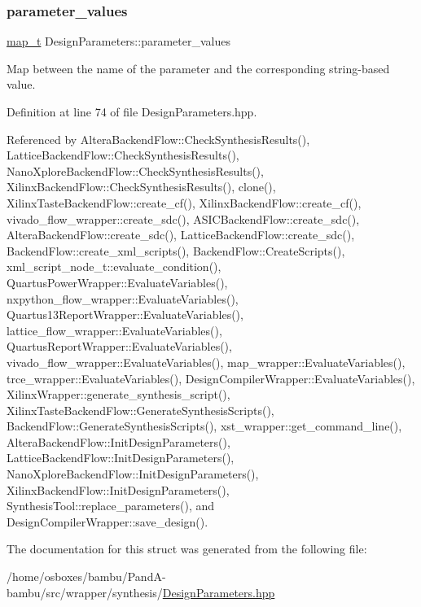 \subsubsection{\texorpdfstring{parameter\+\_\+values}{parameter\_values}}
{\footnotesize\ttfamily \hyperlink{structDesignParameters_abe27b44a8a6b5a2dd04e2f4b637823a0}{map\+\_\+t} Design\+Parameters\+::parameter\+\_\+values}



Map between the name of the parameter and the corresponding string-\/based value. 



Definition at line 74 of file Design\+Parameters.\+hpp.



Referenced by Altera\+Backend\+Flow\+::\+Check\+Synthesis\+Results(), Lattice\+Backend\+Flow\+::\+Check\+Synthesis\+Results(), Nano\+Xplore\+Backend\+Flow\+::\+Check\+Synthesis\+Results(), Xilinx\+Backend\+Flow\+::\+Check\+Synthesis\+Results(), clone(), Xilinx\+Taste\+Backend\+Flow\+::create\+\_\+cf(), Xilinx\+Backend\+Flow\+::create\+\_\+cf(), vivado\+\_\+flow\+\_\+wrapper\+::create\+\_\+sdc(), A\+S\+I\+C\+Backend\+Flow\+::create\+\_\+sdc(), Altera\+Backend\+Flow\+::create\+\_\+sdc(), Lattice\+Backend\+Flow\+::create\+\_\+sdc(), Backend\+Flow\+::create\+\_\+xml\+\_\+scripts(), Backend\+Flow\+::\+Create\+Scripts(), xml\+\_\+script\+\_\+node\+\_\+t\+::evaluate\+\_\+condition(), Quartus\+Power\+Wrapper\+::\+Evaluate\+Variables(), nxpython\+\_\+flow\+\_\+wrapper\+::\+Evaluate\+Variables(), Quartus13\+Report\+Wrapper\+::\+Evaluate\+Variables(), lattice\+\_\+flow\+\_\+wrapper\+::\+Evaluate\+Variables(), Quartus\+Report\+Wrapper\+::\+Evaluate\+Variables(), vivado\+\_\+flow\+\_\+wrapper\+::\+Evaluate\+Variables(), map\+\_\+wrapper\+::\+Evaluate\+Variables(), trce\+\_\+wrapper\+::\+Evaluate\+Variables(), Design\+Compiler\+Wrapper\+::\+Evaluate\+Variables(), Xilinx\+Wrapper\+::generate\+\_\+synthesis\+\_\+script(), Xilinx\+Taste\+Backend\+Flow\+::\+Generate\+Synthesis\+Scripts(), Backend\+Flow\+::\+Generate\+Synthesis\+Scripts(), xst\+\_\+wrapper\+::get\+\_\+command\+\_\+line(), Altera\+Backend\+Flow\+::\+Init\+Design\+Parameters(), Lattice\+Backend\+Flow\+::\+Init\+Design\+Parameters(), Nano\+Xplore\+Backend\+Flow\+::\+Init\+Design\+Parameters(), Xilinx\+Backend\+Flow\+::\+Init\+Design\+Parameters(), Synthesis\+Tool\+::replace\+\_\+parameters(), and Design\+Compiler\+Wrapper\+::save\+\_\+design().



The documentation for this struct was generated from the following file\+:\begin{DoxyCompactItemize}
\item 
/home/osboxes/bambu/\+Pand\+A-\/bambu/src/wrapper/synthesis/\hyperlink{DesignParameters_8hpp}{Design\+Parameters.\+hpp}\end{DoxyCompactItemize}
